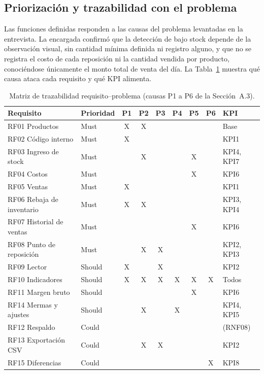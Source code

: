 \documentclass[10pt,a4paper]{article}
\begin{document}
\subsection{Priorización y trazabilidad con el problema}

Las funciones definidas responden a las causas del problema levantadas en la entrevista. La encargada confirmó que la detección de bajo stock depende de la observación visual, sin cantidad mínima definida ni registro alguno, y que no se registra el costo de cada reposición ni la cantidad vendida por producto, conociéndose únicamente el monto total de venta del día. La Tabla~\ref{tab:traza} muestra qué causa ataca cada requisito y qué KPI alimenta.

\begin{table}[H]
\centering\small
\setlength{\tabcolsep}{4pt}
\begin{tabular}{@{}llccccccl@{}}
\toprule
\textbf{Requisito} & \textbf{Prioridad} & \textbf{P1} & \textbf{P2} & \textbf{P3} & \textbf{P4} & \textbf{P5} & \textbf{P6} & \textbf{KPI} \\
\midrule
RF01 Productos & Must & X & X & & & & & Base \\
RF02 Código interno & Must & X & & & & & & KPI1 \\
RF03 Ingreso de stock & Must & & X & & & X & & KPI4, KPI7 \\
RF04 Costos & Must & & & & & X & & KPI6 \\
RF05 Ventas & Must & X & & & & & & KPI1 \\
RF06 Rebaja de inventario & Must & X & X & & & & & KPI3, KPI4 \\
RF07 Historial de ventas & Must & & & & & X & & KPI6 \\
RF08 Punto de reposición & Must & & X & X & & & & KPI2, KPI3 \\
RF09 Lector & Should & X & & X & & & & KPI2 \\
RF10 Indicadores & Should & X & X & X & X & X & X & Todos \\
RF11 Margen bruto & Should & & & & & X & & KPI6 \\
RF14 Mermas y ajustes & Should & & X & & X & & & KPI4, KPI5 \\
RF12 Respaldo & Could & & & & & & & (RNF08) \\
RF13 Exportación CSV & Could & & X & X & & & & KPI2 \\
RF15 Diferencias & Could & & & & & & X & KPI8 \\
\bottomrule
\end{tabular}
\caption{Matriz de trazabilidad requisito--problema (causas P1 a P6 de la Sección~A.3).}
\label{tab:traza}
\end{table}
\end{document}

